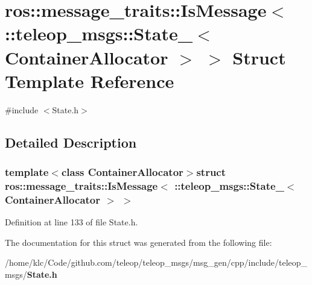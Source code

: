 \section{ros::message\_\-traits::IsMessage$<$ ::teleop\_\-msgs::State\_\-$<$ ContainerAllocator $>$ $>$ Struct Template Reference}
\label{structros_1_1message__traits_1_1IsMessage_3_01_1_1teleop__msgs_1_1State___3_01ContainerAllocator_01_4_01_4}


{\ttfamily \#include $<$State.h$>$}



\subsection{Detailed Description}
\subsubsection*{template$<$class ContainerAllocator$>$struct ros::message\_\-traits::IsMessage$<$ ::teleop\_\-msgs::State\_\-$<$ ContainerAllocator $>$ $>$}



Definition at line 133 of file State.h.



The documentation for this struct was generated from the following file:\begin{DoxyCompactItemize}
\item 
/home/klc/Code/github.com/teleop/teleop\_\-msgs/msg\_\-gen/cpp/include/teleop\_\-msgs/{\bf State.h}\end{DoxyCompactItemize}
